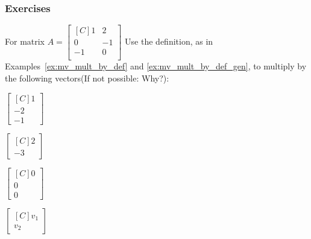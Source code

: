 \subsubsection{Exercises}
\begin{exercise}For matrix 
$A=\begin{bmatrix*}[C]
1  & 2  \\
0  & -1  \\
-1 & 0  \\
\end{bmatrix*}$
Use the definition, as in \\Examples~\ref{ex:mv_mult_by_def}
and \ref{ex:mv_mult_by_def_gen}, to  multiply by the 
following vectors(If not possible: Why?):\\
\begin{inparaenum}[a.)]
\item $\begin{bmatrix*}[C]1 \\ -2 \\ -1 \end{bmatrix*}$\hspace{1cm}
\item $\begin{bmatrix*}[C]2 \\ -3 \end{bmatrix*}$\hspace{1cm}
\item $\begin{bmatrix*}[C]0 \\ 0 \\ 0 \end{bmatrix*}$\hspace{1cm}
\item $\begin{bmatrix*}[C]v_1 \\ v_2 \end{bmatrix*}$
\end{inparaenum}
\end{exercise}

